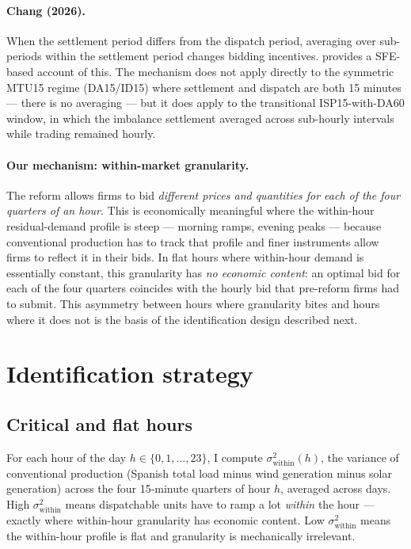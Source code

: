 \documentclass[11pt,a4paper]{article}
\begin{document}
\paragraph{Chang (2026).} When the settlement period differs from the dispatch period, averaging over sub-periods within the settlement period changes bidding incentives. \citet{Chang2026} provides a SFE-based account of this. The mechanism does not apply directly to the symmetric MTU15 regime (DA15/ID15) where settlement and dispatch are both 15 minutes --- there is no averaging --- but it does apply to the transitional ISP15-with-DA60 window, in which the imbalance settlement averaged across sub-hourly intervals while trading remained hourly.

\paragraph{Our mechanism: within-market granularity.} The reform allows firms to bid \emph{different prices and quantities for each of the four quarters of an hour}. This is economically meaningful where the within-hour residual-demand profile is steep --- morning ramps, evening peaks --- because conventional production has to track that profile and finer instruments allow firms to reflect it in their bids. In flat hours where within-hour demand is essentially constant, this granularity has \emph{no economic content}: an optimal bid for each of the four quarters coincides with the hourly bid that pre-reform firms had to submit. This asymmetry between hours where granularity bites and hours where it does not is the basis of the identification design described next.

\section{Identification strategy}\label{sec:identification}

\subsection{Critical and flat hours}

For each hour of the day $h \in \{0,1,\ldots,23\}$, I compute $\sigma^2_{\text{within}}(h)$, the variance of conventional production (Spanish total load minus wind generation minus solar generation) across the four 15-minute quarters of hour $h$, averaged across days. High $\sigma^2_{\text{within}}$ means dispatchable units have to ramp a lot \emph{within} the hour --- exactly where within-hour granularity has economic content. Low $\sigma^2_{\text{within}}$ means the within-hour profile is flat and granularity is mechanically irrelevant.
\end{document}

